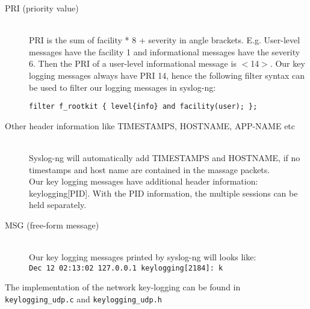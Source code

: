 \begin{description}
\item[PRI (priority value)] \hfill \\
PRI is the sum of facility * 8 + severity in angle brackets. E.g. User-level
messages have the facility 1 and informational messages have the severity 6.
Then the PRI of a user-level informational message is $<$14$>$. 
Our key logging messages  always have PRI 14, hence the following filter 
syntax can be used to filter our logging messages in syslog-ng:
\begin{center}
\lstset{escapechar=,style=customc}
\begin{lstlisting}
filter f_rootkit { level{info} and facility(user); };
\end{lstlisting}
\end{center}
\item[Other header information like TIMESTAMPS, HOSTNAME, APP-NAME etc] \hfill \\
Syslog-ng will automatically add TIMESTAMPS and HOSTNAME, if no timestamps 
and host name are contained in the massage packets.\\ 
Our key logging messages have additional header information: keylogging[PID]. 
With the PID information, the multiple sessions can be held separately.
\item[MSG (free-form message)]\hfill\\
Our key logging messages printed by syslog-ng will looks like:
\\
\verb+Dec 12 02:13:02 127.0.0.1 keylogging[2184]: k+
\end{description}
The implementation of the network key-logging can be found in 
\verb+keylogging_udp.c+ and \verb+keylogging_udp.h+\\
